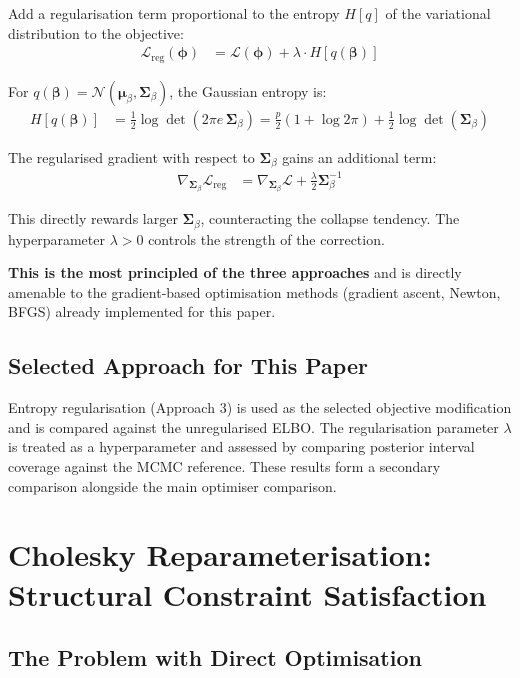 \documentclass[11pt,a4paper]{article}
\begin{document}
Add a regularisation term proportional to the entropy $H[q]$ of the variational distribution to the objective:
\begin{align}
  \mathcal{L}_{\text{reg}}(\bm{\phi}) &= \mathcal{L}(\bm{\phi}) + \lambda \cdot H[q(\bm{\beta})]
\end{align}

For $q(\bm{\beta}) = \mathcal{N}(\bm{\mu}_\beta, \bm{\Sigma}_\beta)$, the Gaussian entropy is:
\begin{align}
  H[q(\bm{\beta})] &= \frac{1}{2} \log \det(2\pi e\, \bm{\Sigma}_\beta)
               = \frac{p}{2}(1 + \log 2\pi) + \frac{1}{2}\log\det(\bm{\Sigma}_\beta)
\end{align}

The regularised gradient with respect to $\bm{\Sigma}_\beta$ gains an additional term:
\begin{align}
  \nabla_{\bm{\Sigma}_\beta} \mathcal{L}_{\text{reg}} &= \nabla_{\bm{\Sigma}_\beta} \mathcal{L} + \frac{\lambda}{2} \bm{\Sigma}_\beta^{-1}
\end{align}

This directly rewards larger $\bm{\Sigma}_\beta$, counteracting the collapse tendency. The hyperparameter $\lambda > 0$ controls the strength of the correction.

\textbf{This is the most principled of the three approaches} and is directly amenable to the gradient-based optimisation methods (gradient ascent, Newton, BFGS) already implemented for this paper.

\subsection*{Selected Approach for This Paper}

Entropy regularisation (Approach 3) is used as the selected objective modification and is compared against the unregularised ELBO. The regularisation parameter $\lambda$ is treated as a hyperparameter and assessed by comparing posterior interval coverage against the MCMC reference. These results form a secondary comparison alongside the main optimiser comparison.



\section{Cholesky Reparameterisation: Structural Constraint Satisfaction}\label{app:cholesky}

\subsection*{The Problem with Direct Optimisation}
\end{document}
